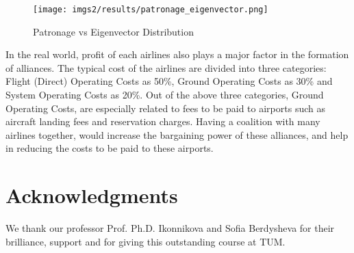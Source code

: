 \documentclass[twocolumn]{tum-article}
\begin{document}
\begin{figure}
	\centering
	\texttt{[image: imgs2/results/patronage\_eigenvector.png]}
	\caption{
	Patronage vs Eigenvector Distribution}
\label{fig:patronage_eigenvector}
\end{figure}

In the real world, profit of each airlines also plays a major factor in the formation of alliances. The typical cost of the airlines are divided into three categories: Flight (Direct) Operating Costs as 50\%, Ground Operating Costs as 30\% and System Operating Costs as 20\%. \cite{airline_operating_cost}
Out of the above three categories, Ground Operating Costs, are especially related to fees to be paid to airports such as aircraft landing fees and reservation charges. 
Having a coalition with many airlines together, would increase the bargaining power of these alliances, and help in reducing the costs to be paid to these airports. 


\section*{Acknowledgments}
We thank our professor Prof. Ph.D. Ikonnikova and Sofia Berdysheva for their brilliance, support and for giving this outstanding course at TUM.



\end{document}
